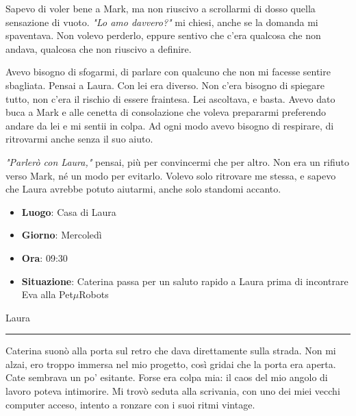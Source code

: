 Sapevo di voler bene a Mark, ma non riuscivo a scrollarmi di dosso quella sensazione di vuoto. \emph{"Lo amo davvero?"} mi chiesi, anche se la domanda mi spaventava. Non volevo perderlo, eppure sentivo che c'era qualcosa che non andava, qualcosa che non riuscivo a definire.

Avevo bisogno di sfogarmi, di parlare con qualcuno che non mi facesse sentire sbagliata. Pensai a Laura. Con lei era diverso. Non c'era bisogno di spiegare tutto, non c'era il rischio di essere fraintesa. Lei ascoltava, e basta. Avevo dato buca a Mark e alle cenetta di consolazione che voleva prepararmi preferendo andare da lei e mi sentii in colpa. Ad ogni modo  avevo  bisogno di respirare, di ritrovarmi anche senza il suo aiuto.

\emph{"Parlerò con Laura,"} pensai, più per convincermi che per altro. Non era un rifiuto verso Mark, né un modo per evitarlo. Volevo solo ritrovare me stessa, e sapevo che Laura avrebbe potuto aiutarmi, anche solo standomi accanto.




\newpage
\begin{tcolorbox}[colback=gray!5,colframe=gray!80,title=\textbf{Scheda Informativa}]

    \begin{itemize}
        \item \textbf{Luogo}: Casa di Laura
        \item \textbf{Giorno}: Mercoledì
        \item \textbf{Ora}: 09:30
        \item \textbf{Situazione}: Caterina passa per un saluto rapido a Laura prima di incontrare Eva alla Pet$\mu$Robots
    \end{itemize}
\end{tcolorbox}

\vspace{1em}
\begin{center}Laura\end{center}
\hrule
\vspace{1em}

\vspace{1em}

Caterina suonò alla porta sul retro che dava direttamente sulla strada. Non mi alzai, ero troppo immersa nel mio progetto, così gridai che la porta era aperta. Cate sembrava un po’ esitante. Forse era colpa mia: il caos del mio angolo di lavoro poteva intimorire. Mi trovò seduta alla scrivania, con uno dei miei vecchi computer acceso, intento a ronzare con i suoi ritmi vintage.

